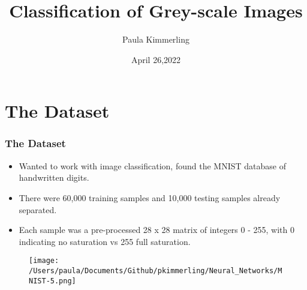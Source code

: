 \documentclass{beamer}
\title{Classification of Grey-scale Images}
\author{Paula Kimmerling}
\date{April 26,2022}
\begin{document}
	\begin{frame}
		\titlepage
	\end{frame}
	\begin{frame}
		\tableofcontents
	\end{frame}
\section{The Dataset}
	\begin{frame}
		\frametitle{The Dataset}
		\begin{itemize}
			\pause
			\item Wanted to work with image classification, found the MNIST database of handwritten digits.
			\pause
			\item There were 60,000 training samples and 10,000 testing samples already separated.
			\pause
			\item Each sample was a pre-processed 28 x 28 matrix of integers 0 - 255, with 0 indicating no saturation vs 255 full saturation.
		\end{itemize}
	\begin{figure}
		\texttt{[image: /Users/paula/Documents/Github/pkimmerling/Neural\_Networks/MNIST-5.png]}
	\end{figure}
	\end{frame}
\end{document}
